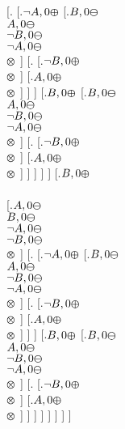 \documentclass{article}
\begin{document}
[.{} [.{$\neg A, 0\varoplus $} [.{$B, 0\varominus $ \\ $A, 0\varominus $ \\ $\neg B, 0\varominus $ \\ $\neg A, 0\varominus $ \\ $ \varotimes  $}  ] 
[.{} [.{$\neg B, 0\varoplus $ \\ $ \varotimes  $}  ] 
[.{$A, 0\varoplus $ \\ $ \varotimes  $}  ]  ]  ] 
[.{$B, 0\varoplus $} [.{$B, 0\varominus $ \\ $A, 0\varominus $ \\ $\neg B, 0\varominus $ \\ $\neg A, 0\varominus $ \\ $ \varotimes  $}  ] 
[.{} [.{$\neg B, 0\varoplus $ \\ $ \varotimes  $}  ] 
[.{$A, 0\varoplus $ \\ $ \varotimes  $}  ]  ]  ]  ]  ] 
[.{$B, 0\varoplus $ \\  \\ } [.{$A, 0\varominus $ \\ $B, 0\varominus $ \\ $\neg A, 0\varominus $ \\ $\neg B, 0\varominus $ \\ $ \varotimes  $}  ] 
[.{} [.{$\neg A, 0\varoplus $} [.{$B, 0\varominus $ \\ $A, 0\varominus $ \\ $\neg B, 0\varominus $ \\ $\neg A, 0\varominus $ \\ $ \varotimes  $}  ] 
[.{} [.{$\neg B, 0\varoplus $ \\ $ \varotimes  $}  ] 
[.{$A, 0\varoplus $ \\ $ \varotimes  $}  ]  ]  ] 
[.{$B, 0\varoplus $} [.{$B, 0\varominus $ \\ $A, 0\varominus $ \\ $\neg B, 0\varominus $ \\ $\neg A, 0\varominus $ \\ $ \varotimes  $}  ] 
[.{} [.{$\neg B, 0\varoplus $ \\ $ \varotimes  $}  ] 
[.{$A, 0\varoplus $ \\ $ \varotimes  $}  ]  ]  ]  ]  ]  ]  ]  ]
\end{document}
